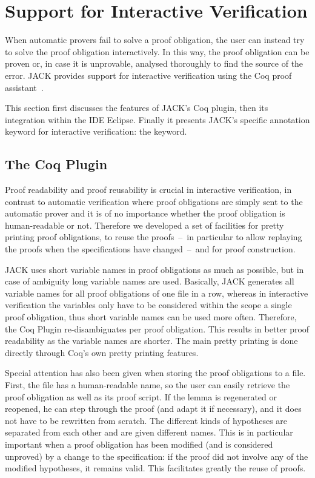 

\section{Support for Interactive Verification}\label{SecInteractive}
When automatic provers fail to solve a proof obligation, the user can
instead try to solve the proof obligation interactively.  In this way,
the proof obligation can be proven or, in case it is unprovable,
analysed thoroughly to find the source of the error. JACK provides
support for interactive verification using the Coq proof
assistant~\cite{Coq04}. 

This section first discusses the features of JACK's Coq plugin, then
its integration within the IDE Eclipse. Finally it presents JACK's
specific annotation keyword for interactive verification: the
\native keyword. 

\subsection{The Coq Plugin}

Proof readability and proof reusability is crucial in interactive
verification, in contrast to automatic verification where proof
obligations are simply sent to the automatic prover and it is of no
importance whether the proof obligation is human-readable or not.
Therefore we developed a set of facilities for pretty printing proof
obligations, to reuse the proofs~--~in particular to allow replaying
the proofs when the specifications have changed~--~and for proof
construction.

JACK uses short variable names in proof obligations as much as
possible, but in case of ambiguity long variable names are used.
Basically, JACK generates all variable names for all proof obligations
of one file in a row, whereas in interactive verification the
variables only have to be considered within the scope a single proof
obligation, thus short variable names can be used more often.
Therefore, the Coq Plugin re-disambiguates per proof obligation.  This
results in better proof readability as the variable names are shorter.
The main pretty printing is done directly through Coq's own pretty
printing features.


Special attention has also been given when storing the proof
obligations to a file. First, the file has a human-readable name, so
the user can easily retrieve the proof obligation as well as its proof
script. If the lemma is regenerated or reopened, he can step through
the proof (and adapt it if necessary), and it does not have to be
rewritten from scratch.  The different kinds of hypotheses are
separated from each other and are given different names.  This is in
particular important when a proof obligation has been modified (and is
considered unproved) by a change to the specification: if the proof
did not involve any of the modified hypotheses, it remains valid. This
facilitates greatly the reuse of proofs.

